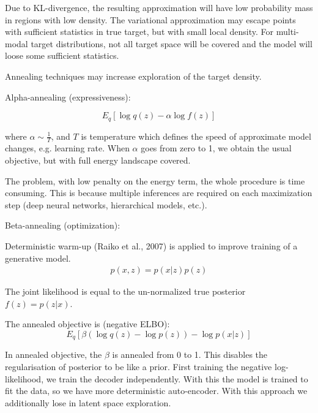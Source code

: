 \documentclass[10pt,letterpaper]{article}
\begin{document}

Due to KL-divergence, the resulting approximation will have low probability mass in regions with low density. The variational approximation may escape points with sufficient statistics in true target, but with small local density. For multi-modal target distributions, not all target space will be covered and the model will loose some sufficient statistics.

Annealing techniques may increase exploration of the target density.

Alpha-annealing (expressiveness):

\begin{equation*}
    E_q[\log q(z) - \alpha \log f(z)]
\end{equation*}

where $\alpha \sim \frac{1}{T}$, and $T$ is temperature which defines the speed of approximate model changes, e.g. learning rate. 
When $\alpha$ goes from zero to 1, we obtain the usual objective, but with full energy landscape covered. 

The problem, with low penalty on the energy term, the whole procedure is time consuming. This is because multiple inferences are required on each maximization step (deep neural networks, hierarchical models, etc.).

Beta-annealing (optimization): 

Deterministic warm-up (Raiko et al., 2007) is applied to improve training of a generative model. 
\begin{align*}
    p(x, z) = p(x|z)p(z)
\end{align*}

The joint likelihood is equal to the un-normalized true posterior $f(z) = p(z | x)$.

The annealed objective is (negative ELBO):
\begin{equation*}
    E_q[\beta (\log q(z) - \log p(z)) - \log p(x|z)]
\end{equation*}

In annealed objective, the $\beta$ is annealed from 0 to 1. This disables the regularisation of posterior to be like a prior. First  training the negative log-likelihood, we train the decoder independently. With this the model is trained to fit the data, so we have more deterministic auto-encoder. With this approach we additionally lose in latent space exploration.
\end{document}
